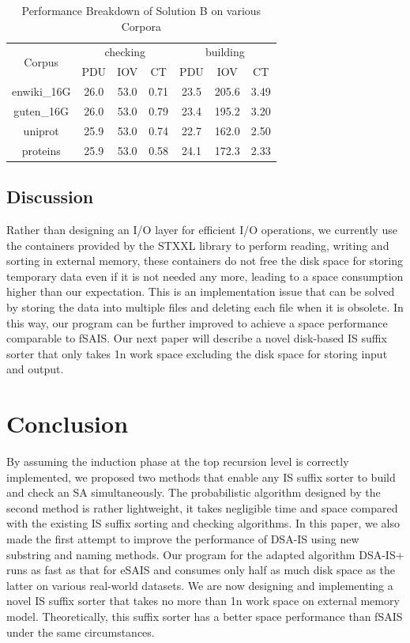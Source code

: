 \documentclass[10pt,journal,compsoc]{IEEEtran}
\begin{document}
\begin{table}%
	\caption{Performance Breakdown of Solution B on various Corpora}
	\label{tbl:breakdown_solutionb}
	\centering
	\begin{tabular}{|c|c|c|c|c|c|c|}
		\hline
		\multirow{2}{*}{Corpus} & \multicolumn{3}{|c}{checking} & \multicolumn{3}{|c|}{building} \\\cline{2-7}
		& PDU & IOV & CT & PDU & IOV & CT \\\hline
		enwiki\_16G & 26.0 & 53.0 & 0.71 & 23.5 & 205.6 & 3.49 \\\hline
		guten\_16G & 26.0 & 53.0 & 0.79 & 23.4 & 195.2 & 3.20 \\\hline
		uniprot & 25.9 & 53.0 & 0.74 & 22.7 & 162.0 & 2.50 \\\hline
		proteins & 25.9 & 53.0 & 0.58 & 24.1 & 172.3 & 2.33 \\\hline
	\end{tabular}
\end{table}%

\subsection{Discussion}

Rather than designing an I/O layer for efficient I/O operations, we currently use the containers provided by the STXXL library to perform reading, writing and sorting in external memory, these containers do not free the disk space for storing temporary data even if it is not needed any more, leading to a space consumption higher than our expectation. This is an implementation issue that can be solved by storing the data into multiple files and deleting each file when it is obsolete. In this way, our program can be further improved to achieve a space performance comparable to fSAIS. Our next paper will describe a novel disk-based IS suffix sorter that only takes 1n work space excluding the disk space for storing input and output. 

\section{Conclusion} \label{sec:conclusion}

By assuming the induction phase at the top recursion level is correctly implemented, we proposed two methods that enable any IS suffix sorter to build and check an SA simultaneously. The probabilistic algorithm designed by the second method is rather lightweight, it takes negligible time and space compared with the existing IS suffix sorting and checking algorithms. In this paper, we also made the first attempt to improve the performance of DSA-IS using new substring and naming methods. Our program for the adapted algorithm DSA-IS+ runs as fast as that for eSAIS and consumes only half as much disk space as the latter on various real-world datasets. We are now designing and implementing a novel IS suffix sorter that takes no more than 1n work space on external memory model. Theoretically, this suffix sorter has a better space performance than fSAIS under the same circumstances. 



\end{document}
